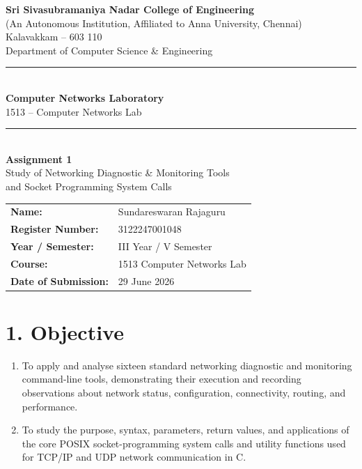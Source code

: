 \documentclass[11pt]{article}
\title{\vspace{-2cm}}
\date{}
\begin{document}
\begin{titlepage}
\centering
\vspace*{1cm}
{\large \textbf{Sri Sivasubramaniya Nadar College of Engineering}}\\
{\small (An Autonomous Institution, Affiliated to Anna University, Chennai)}\\
{\small Kalavakkam -- 603 110}\\[0.3cm]
{\small Department of Computer Science \& Engineering}\\[1.5cm]

\rule{\linewidth}{0.5mm}\\[0.4cm]
{\LARGE \textbf{Computer Networks Laboratory}}\\[0.3cm]
{\Large 1513 -- Computer Networks Lab}\\[0.4cm]
\rule{\linewidth}{0.5mm}\\[1.5cm]

{\huge \textbf{Assignment 1}}\\[0.4cm]
{\Large Study of Networking Diagnostic \& Monitoring Tools\\ and Socket Programming System Calls}\\[2cm]

\begin{center}
\begin{tabular}{ll}
\textbf{Name:} & Sundareswaran Rajaguru \\[0.2cm]
\textbf{Register Number:} & 3122247001048 \\[0.2cm]
\textbf{Year / Semester:} & III Year / V Semester \\[0.2cm]
\textbf{Course:} & 1513 Computer Networks Lab \\[0.2cm]
\textbf{Date of Submission:} & 29 June 2026 \\[0.2cm]
\end{tabular}
\end{center}

\vfill
\end{titlepage}

\section*{1. Objective}
\begin{enumerate}
  \item To apply and analyse sixteen standard networking diagnostic and monitoring
        command-line tools, demonstrating their execution and recording observations about
        network status, configuration, connectivity, routing, and performance.
  \item To study the purpose, syntax, parameters, return values, and applications of the
        core POSIX socket-programming system calls and utility functions used for TCP/IP and
        UDP network communication in C.
\end{enumerate}
\end{document}
